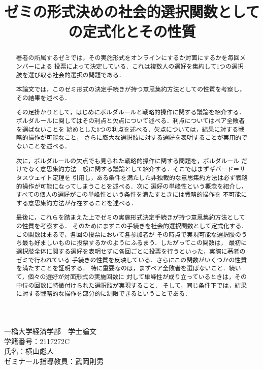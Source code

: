 \documentclass[dvipdfmx]{jsarticle}
\begin{document}
\title{ゼミの形式決めの社会的選択関数としての定式化とその性質}
\author{}
\date{}
\maketitle

\begin{center}
  一橋大学経済学部　学士論文\\
  学籍番号：2117272C\\
  氏名：横山彪人\\
  ゼミナール指導教員：武岡則男
\end{center}

\vfill
\begin{abstract}
  著者の所属するゼミでは，その実施形式をオンラインにするか対面にするかを毎回メンバーによる
  投票によって決定している．これは複数人の選好を集約して1つの選択肢を選び取る社会的選択の問題である．
  
  本論文では，このゼミ形式の決定手続きが持つ意思集約方法としての性質を考察し，その結果を述べる．
  
  その足掛かりとして，はじめにボルダルールと戦略的操作に関する議論を紹介する．
  ボルダルールに関してはその利点と欠点について述べる．利点についてはペア全敗者を選ばないことを
  始めとした5つの利点を述べる．欠点については，結果に対する戦略的操作が可能なこと，
  さらに膨大な選択肢に対する選好を表明することが実用的でないことを述べる．
  
  次に，ボルダルールの欠点でも見られた戦略的操作に関する問題を，ボルダルール
  だけでなく意思集約方法一般に関する議論として紹介する．そこではまずギバード＝サタスウェイト定理を
  引用し，ある条件を満たした非独裁的な意思集約方法は必ず戦略的操作が可能になってしまうことを述べる．次に
  選好の単峰性という概念を紹介し，すべての個人の選好がこの単峰性という条件を満たすときには戦略的操作を
  不可能にする意思集約方法が存在することを述べる．
  
  最後に，これらを踏まえた上でゼミの実施形式決定手続きが持つ意思集約方法としての性質を考察する．
  そのためにまずこの手続きを社会的選択関数として定式化する．この関数はまるで，各回の投票において各参加者が
  その時点で実現可能な選択肢のうち最も好ましいものに投票するかのようにふるまう．したがってこの関数は，
  最初に選択肢全体に関する選好を表明せずに各回ごとに投票を行うといった，実際に著者のゼミで行われている
  手続きの性質を反映している．さらにこの関数がいくつかの性質を満たすことを証明する．
  特に重要なのは，まずペア全敗者を選ばないこと．続いて，個々の選好が対面形式の実施回数に
  対して単峰性が成り立っているときは，その中位の回数に特徴付けられた選択肢が実現すること．
  そして，同じ条件下では，結果に対する戦略的な操作を部分的に制限できるということである．\\
\end{abstract}
\vfill
\end{document}
